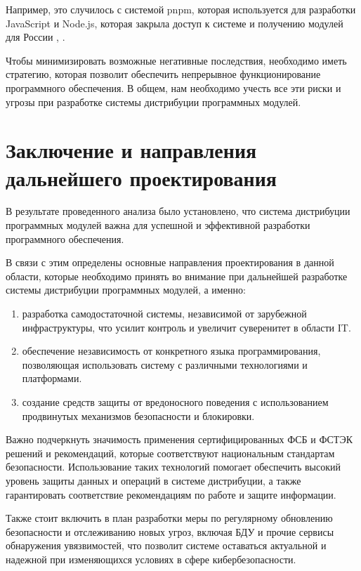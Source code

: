 Например, это случилось с системой pnpm, которая используется для разработки JavaScript и Node.js, которая закрыла доступ к системе и получению модулей для России \cite{risk:pnpm_block_1}, \cite{risk:pnpm_block_2}. 

Чтобы минимизировать возможные негативные последствия, необходимо иметь стратегию, которая позволит обеспечить непрерывное функционирование программного обеспечения. В общем, нам необходимо учесть все эти риски и угрозы при разработке системы дистрибуции программных модулей. 

\section{Заключение и направления дальнейшего проектирования}

В результате проведенного анализа было установлено, что система дистрибуции программных модулей важна для успешной и эффективной разработки программного обеспечения. 

В связи с этим определены основные направления проектирования в данной области, которые необходимо принять во внимание при дальнейшей разработке системы дистрибуции программных модулей, а именно:

\begin{enumerate}
\item разработка самодостаточной системы, независимой от зарубежной инфраструктуры, что усилит контроль и увеличит суверенитет в области IT.
\item обеспечение независимость от конкретного языка программирования, позволяющая использовать систему с различными технологиями и платформами.
\item создание средств защиты от вредоносного поведения с использованием продвинутых механизмов безопасности и блокировки.
\end{enumerate}

Важно подчеркнуть значимость применения сертифицированных ФСБ и ФСТЭК решений и рекомендаций, которые соответствуют национальным стандартам безопасности. Использование таких технологий помогает обеспечить высокий уровень защиты данных и операций в системе дистрибуции, а также гарантировать соответствие рекомендациям по работе и защите информации.

Также стоит включить в план разработки меры по регулярному обновлению безопасности и отслеживанию новых угроз, включая БДУ и прочие сервисы обнаружения увязвимостей, что позволит системе оставаться актуальной и надежной при изменяющихся условиях в сфере кибербезопасности.

